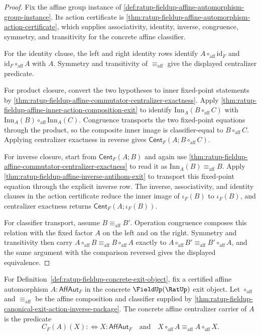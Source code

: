 \begin{proof}
Fix the affine group instance of
\autoref{def:ratup-fieldup-affine-automorphism-group-instance}. Its action
certificate is
\autoref{thm:ratup-fieldup-affine-automorphism-action-certificate}, which
supplies associativity, identity, inverse, congruence, symmetry, and
transitivity for the concrete affine classifier.

For the identity clause, the left and right identity rows identify
$A\circ_{\mathrm{aff}}\mathrm{id}_F$ and
$\mathrm{id}_F\circ_{\mathrm{aff}}A$ with $A$. Symmetry and transitivity of
$\equiv_{\mathrm{aff}}$ give the displayed centralizer predicate.

For product closure, convert the two hypotheses to inner fixed-point
statements by
\autoref{thm:ratup-fieldup-affine-commutator-centralizer-exactness}. Apply
\autoref{thm:ratup-fieldup-affine-inner-action-composition-exit} to identify
$\mathrm{Inn}_A(B\circ_{\mathrm{aff}}C)$ with
$\mathrm{Inn}_A(B)\circ_{\mathrm{aff}}\mathrm{Inn}_A(C)$. Congruence transports
the two fixed-point equations through the product, so the composite inner
image is classifier-equal to $B\circ_{\mathrm{aff}}C$. Applying centralizer
exactness in reverse gives
$\mathsf{Cent}_F(A;B\circ_{\mathrm{aff}}C)$.

For inverse closure, start from $\mathsf{Cent}_F(A;B)$ and again use
\autoref{thm:ratup-fieldup-affine-commutator-centralizer-exactness} to read it
as $\mathrm{Inn}_A(B)\equiv_{\mathrm{aff}}B$. Apply
\autoref{thm:ratup-fieldup-affine-inverse-antihom-exit} to transport this
fixed-point equation through the explicit inverse row. The inverse,
associativity, and identity clauses in the action certificate reduce the inner
image of $\iota_F(B)$ to $\iota_F(B)$, and centralizer exactness returns
$\mathsf{Cent}_F(A;\iota_F(B))$.

For classifier transport, assume $B\equiv_{\mathrm{aff}}B'$. Operation
congruence composes this relation with the fixed factor $A$ on the left and on
the right. Symmetry and transitivity then carry
$A\circ_{\mathrm{aff}}B\equiv_{\mathrm{aff}}B\circ_{\mathrm{aff}}A$ exactly to
$A\circ_{\mathrm{aff}}B'\equiv_{\mathrm{aff}}B'\circ_{\mathrm{aff}}A$, and the
same argument with the comparison reversed gives the displayed equivalence.
\end{proof}

\begin{definition}
\label{def:ratup-fieldup-affine-centralizer-carrier}
For Definition~\ref{def:ratup-fieldup-concrete-exit-object}, fix a certified
affine automorphism $A:\mathsf{AffAut}_F$ in the concrete
$\FieldUp(\RatUp)$ exit object. Let $\circ_{\mathrm{aff}}$ and
$\equiv_{\mathrm{aff}}$ be the affine composition and classifier supplied by
\autoref{thm:ratup-fieldup-canonical-exit-action-inverse-package}. The
concrete affine centralizer carrier of $A$ is the predicate
$$
C_F(A)(X)
:\Longleftrightarrow
X:\mathsf{AffAut}_F
\quad\text{and}\quad
X\circ_{\mathrm{aff}}A\equiv_{\mathrm{aff}}A\circ_{\mathrm{aff}}X.
$$
\end{definition}

